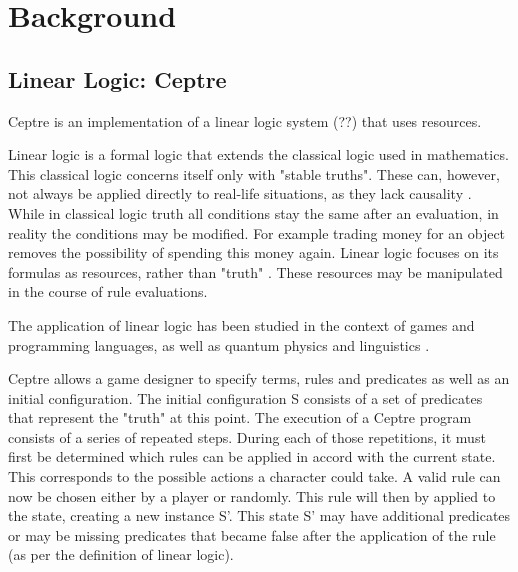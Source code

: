 \section{Background} \label{background}

\subsection{Linear Logic: Ceptre} \label{linear_logic}

Ceptre is an implementation of a linear logic system (??) that uses resources.

Linear logic is a formal logic that extends the classical logic used in mathematics.
This classical logic concerns itself only with "stable truths".
These can, however, not always be applied directly to real-life situations, as they lack causality \cite{girard_1995}.
While in classical logic truth all conditions stay the same after an evaluation, in reality the conditions may be modified.
For example trading money for an object removes the possibility of spending this money again.
Linear logic focuses on its formulas as resources, rather than "truth" \cite{sep-logic-linear}.
These resources may be manipulated in the course of rule evaluations.

The application of linear logic has been studied in the context of games and programming languages, as well as quantum physics and linguistics \cite{sep-logic-linear}. 

Ceptre allows a game designer to specify terms, rules and predicates as well as an initial configuration.
The initial configuration S consists of a set of predicates that represent the "truth" at this point.
The execution of a Ceptre program consists of a series of repeated steps.
During each of those repetitions, it must first be determined which rules can be applied in accord with the current state.
This corresponds to the possible actions a character could take.
A valid rule can now be chosen either by a player or randomly. 
This rule will then by applied to the state, creating a new instance S'.
This state S' may have additional predicates or may be missing predicates that became false after the application of the rule (as per the definition of linear logic).